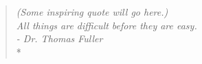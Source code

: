 \phantom{.}
\vspace{4in}

\begin{singlespace}
\begin{quote}
  \textit{(Some inspiring quote will go here.)}\\
  \textit{All things are difficult before they are easy.}\\
  \textit{- Dr. Thomas Fuller}\\*
\end{quote}
\end{singlespace}

%
